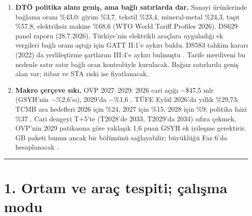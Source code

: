 \begin{enumerate}
\item
  \textbf{DTÖ politika alanı geniş, ama bağlı satırlarda dar.} Sanayi ürünlerinde bağlama oranı \%43,0: giyim \%3,7, tekstil \%23,4, mineral-metal \%24,3, taşıt \%57,8, elektriksiz makine \%68,6 \etiketV{} (WTO World Tariff Profiles 2026). DS629 panel raporu (28.7.2026), Türkiye'nin elektrikli araçlara uyguladığı ek vergileri bağlı oranı aştığı için GATT II:1'e aykırı buldu. DS583 tahkim kararı (2022) da yerlileştirme şartlarını III:4'e aykırı bulmuştu \etiketV{}. Tarife merdiveni bu nedenle satır satır bağlı oran kontrolüyle kurulacak. Bağsız satırlarda geniş alan var; itibar ve STA riski ise fiyatlanacak.
\item
  \textbf{Makro çerçeve sıkı.} OVP 2027--2029: 2026 cari açığı −\$47,5 mlr (GSYH'nin −\%2,6'sı), 2029'da −\%1,6 \etiketV{}. TÜFE Eylül 2026'da yıllık \%29,73; TCMB ara hedefleri 2026 için \%24, 2027 için \%15, 2028 için \%9; politika faizi \%37 \etiketV{}. Cari dengeyi T+5'te (T2028'de 2033, T2029'da 2034) sıfıra çekmek, OVP'nin 2029 patikasına göre yaklaşık 1,6 puan GSYH ek iyileşme gerektirir. GB paketi bunun ancak bir bölümünü sağlayabilir; büyüklüğü Faz 6'da hesaplanacak \etiketH{}.
\end{enumerate}

\begin{center}\rule{0.5\linewidth}{0.5pt}\end{center}

\hypertarget{00_plan-1-ortam-ve-arauxe7-tespiti-uxe7alux131ux15fma-modu}{%
\section{1. Ortam ve araç tespiti; çalışma modu}\label{00_plan-1-ortam-ve-arauxe7-tespiti-uxe7alux131ux15fma-modu}}

\begingroup\gbtablo\small

